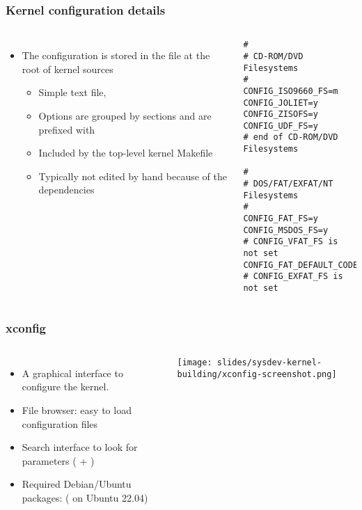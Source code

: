 \begin{frame}[fragile]
  \frametitle{Kernel configuration details}
  \begin{columns}
    \begin{itemize}
    \item The configuration is stored in the  file at the
      root of kernel sources
      \begin{itemize}
      \item Simple text file, 
      \item Options are grouped by sections and are prefixed with
      \item Included by the top-level kernel Makefile
      \item Typically not edited by hand because of the dependencies
      \end{itemize}
    \end{itemize}
    \tiny
\begin{verbatim}
#
# CD-ROM/DVD Filesystems
#
CONFIG_ISO9660_FS=m
CONFIG_JOLIET=y
CONFIG_ZISOFS=y
CONFIG_UDF_FS=y
# end of CD-ROM/DVD Filesystems

#
# DOS/FAT/EXFAT/NT Filesystems
#
CONFIG_FAT_FS=y
CONFIG_MSDOS_FS=y
# CONFIG_VFAT_FS is not set
CONFIG_FAT_DEFAULT_CODEPAGE=437
# CONFIG_EXFAT_FS is not set
\end{verbatim}
  \end{columns}
\end{frame}

\begin{frame}
  \frametitle{xconfig}
  \begin{columns}[T]
    \begin{itemize}
    \item A graphical interface to configure the kernel.
    \item File browser: easy to load configuration files
    \item Search interface to look for parameters (\code{[Ctrl]} + \code{[f]})
    \item Required Debian/Ubuntu packages: 
          ( on Ubuntu 22.04)
    \end{itemize}
    \texttt{[image: slides/sysdev-kernel-building/xconfig-screenshot.png]}
  \end{columns}
\end{frame}

